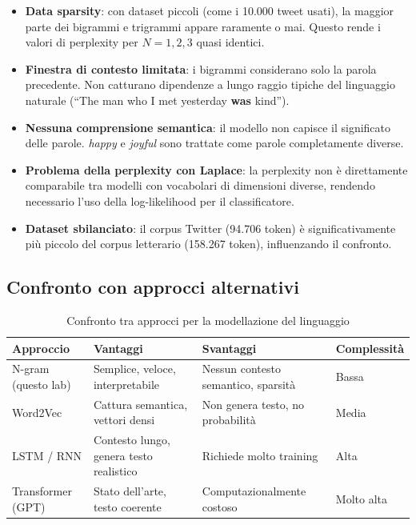 \documentclass[12pt, a4paper]{article}
\begin{document}
\begin{itemize}
    \item \textbf{Data sparsity}: con dataset piccoli (come i 10.000
          tweet usati), la maggior parte dei bigrammi e trigrammi
          appare raramente o mai. Questo rende i valori di perplexity
          per $N=1,2,3$ quasi identici.

    \item \textbf{Finestra di contesto limitata}: i bigrammi
          considerano solo la parola precedente. Non catturano
          dipendenze a lungo raggio tipiche del linguaggio naturale
          (``The man who I met yesterday \textbf{was} kind'').

    \item \textbf{Nessuna comprensione semantica}: il modello non
          capisce il significato delle parole. \textit{happy} e
          \textit{joyful} sono trattate come parole completamente
          diverse.

    \item \textbf{Problema della perplexity con Laplace}:
          la perplexity non è direttamente comparabile tra modelli
          con vocabolari di dimensioni diverse, rendendo necessario
          l'uso della log-likelihood per il classificatore.

    \item \textbf{Dataset sbilanciato}: il corpus Twitter (94.706
          token) è significativamente più piccolo del corpus
          letterario (158.267 token), influenzando il confronto.
\end{itemize}

\subsection{Confronto con approcci alternativi}

\begin{table}[H]
\centering
\begin{tabular}{p{3cm}p{3.5cm}p{3.5cm}p{2.5cm}}
\toprule
\textbf{Approccio} & \textbf{Vantaggi} &
\textbf{Svantaggi} & \textbf{Complessità} \\
\midrule
N-gram (questo lab) &
Semplice, veloce, interpretabile &
Nessun contesto semantico, sparsità &
Bassa \\
\midrule
Word2Vec &
Cattura semantica, vettori densi &
Non genera testo, no probabilità &
Media \\
\midrule
LSTM / RNN &
Contesto lungo, genera testo realistico &
Richiede molto training &
Alta \\
\midrule
Transformer (GPT) &
Stato dell'arte, testo coerente &
Computazionalmente costoso &
Molto alta \\
\bottomrule
\end{tabular}
\caption{Confronto tra approcci per la modellazione del linguaggio}
\end{table}
\end{document}
